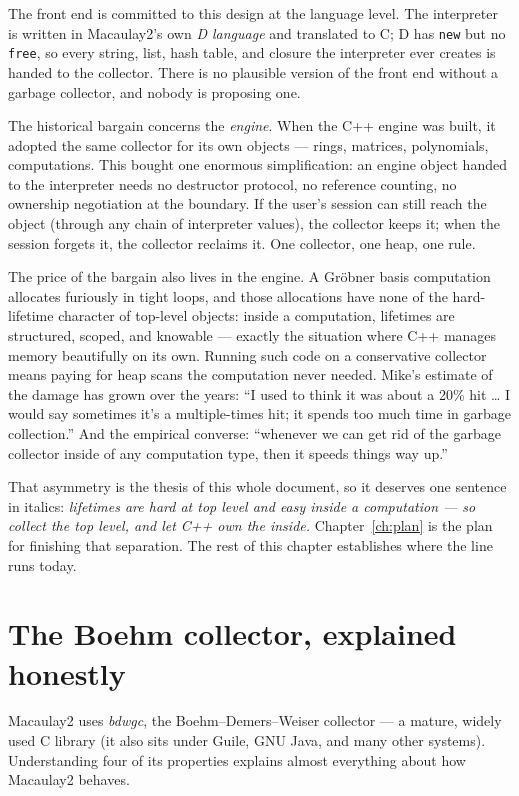 \documentclass[11pt,oneside]{report}
\newcommand{\code}[1]{\textcolor{m2code}{\texttt{#1}}}
\begin{document}
The front end is committed to this design at the language level. The
interpreter is written in Macaulay2's own \emph{D language} and translated to
C; D has \code{new} but no \code{free}, so every string, list, hash table, and
closure the interpreter ever creates is handed to the collector. There is no
plausible version of the front end without a garbage collector, and nobody is
proposing one.

The historical bargain concerns the \emph{engine}. When the C++ engine was
built, it adopted the same collector for its own objects --- rings, matrices,
polynomials, computations. This bought one enormous simplification: an engine
object handed to the interpreter needs no destructor protocol, no reference
counting, no ownership negotiation at the boundary. If the user's session can
still reach the object (through any chain of interpreter values), the
collector keeps it; when the session forgets it, the collector reclaims it.
One collector, one heap, one rule.

The price of the bargain also lives in the engine. A Gr\"obner basis
computation allocates furiously in tight loops, and those allocations have
none of the hard-lifetime character of top-level objects: inside a
computation, lifetimes are structured, scoped, and knowable --- exactly the
situation where C++ manages memory beautifully on its own. Running such code
on a conservative collector means paying for heap scans the computation never
needed. Mike's estimate of the damage has grown over the years: ``I used to
think it was about a 20\% hit \ldots{} I would say sometimes it's a
multiple-times hit; it spends too much time in garbage collection.'' And the
empirical converse: ``whenever we can get rid of the garbage collector inside
of any computation type, then it speeds things way up.''

That asymmetry is the thesis of this whole document, so it deserves one
sentence in italics: \emph{lifetimes are hard at top level and easy inside a
computation --- so collect the top level, and let C++ own the inside.}
Chapter~\ref{ch:plan} is the plan for finishing that separation. The rest of
this chapter establishes where the line runs today.

\section{The Boehm collector, explained honestly}
\label{sec:boehm}

Macaulay2 uses \emph{bdwgc}, the Boehm--Demers--Weiser collector --- a mature,
widely used C library (it also sits under Guile, GNU Java, and many other
systems). Understanding four of its properties explains almost everything
about how Macaulay2 behaves.
\end{document}
